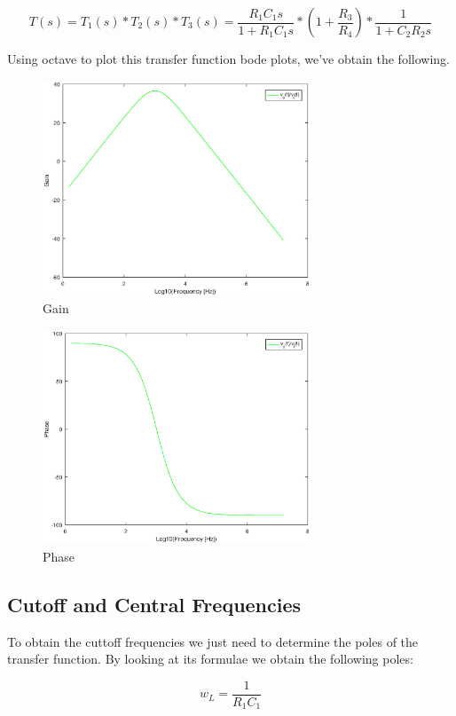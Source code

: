 \begin{equation}
T(s) = T_1(s)*T_2(s)*T_3(s) = \frac{R_1C_1s}{1+R_1C_1s}*(1 + \frac{R_3}{R_4})*\frac{1}{1+ C_2R_2s}
\end{equation} 

Using octave to plot this transfer function bode plots, we've obtain the following.

\begin{figure}[H] 
\centering
\includegraphics[width = 8cm]{gain.eps} 
\caption{Gain}
\label{gain}
\end{figure}

\begin{figure}[H] 
\centering
\includegraphics[width = 8cm]{phase.eps} 
\caption{Phase}
\label{phase}
\end{figure}

\subsection{Cutoff and Central Frequencies}

To obtain the cuttoff frequencies we just need to determine the poles of the transfer function. By looking at its formulae we obtain the following poles:

\begin{equation}
w_L = \frac{1}{R_1C_1}
\end{equation} 

